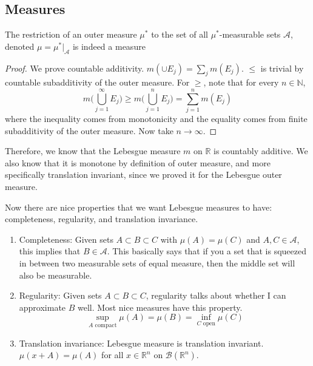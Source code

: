 \subsection{Measures} 

  \begin{theorem}
    The restriction of an outer measure $\mu^\ast$ to the set of all $\mu^\ast$-measurable sets $\mathcal{A}$, denoted $\mu = \mu^\ast \big|_{\mathcal{A}}$ is indeed a measure
  \end{theorem}
  \begin{proof}
    We prove countable additivity. $m( \cup E_j) = \sum_j m(E_j)$. $\leq$ is trivial by countable subadditivity of the outer measure. For $\geq$, note that for every $n \in \mathbb{N}$, 
    \begin{equation}
      m \bigg( \bigcup_{j=1}^\infty E_j \bigg) \geq m \bigg( \bigcup_{j=1}^n E_j \bigg) = \sum_{j=1}^n m(E_j) 
    \end{equation}
    where the inequality comes from monotonicity and the equality comes from finite subadditivity of the outer measure. Now take $n \to \infty$. 
  \end{proof}

  Therefore, we know that the Lebesgue measure $m$ on $\mathbb{R}$ is countably additive. We also know that it is monotone by definition of outer measure, and more specifically translation invariant, since we proved it for the Lebesgue outer measure. 

  Now there are nice properties that we want Lebesgue measures to have: completeness, regularity, and translation invariance. 
  \begin{enumerate}
    \item Completeness: Given sets $A \subset B \subset C$ with $\mu(A) = \mu(C)$ and $A, C \in \mathcal{A}$, this implies that $B \in \mathcal{A}$. This basically says that if you a set that is squeezed in between two measurable sets of equal measure, then the middle set will also be measurable. 

    \item Regularity: Given sets $A \subset B \subset C$, regularity talks about whether I can approximate $B$ well. Most nice measures have this property. 
    \begin{equation}
      \sup_{A \text{ compact}} \mu(A) = \mu(B) = \inf_{C \text{ open}} \mu(C)
    \end{equation}

    \item Translation invariance: Lebesgue measure is translation invariant. $\mu(x + A) = \mu(A)$ for all $x \in \mathbb{R}^n$ on $\mathcal{B}(\mathbb{R}^n)$. 
  \end{enumerate}


